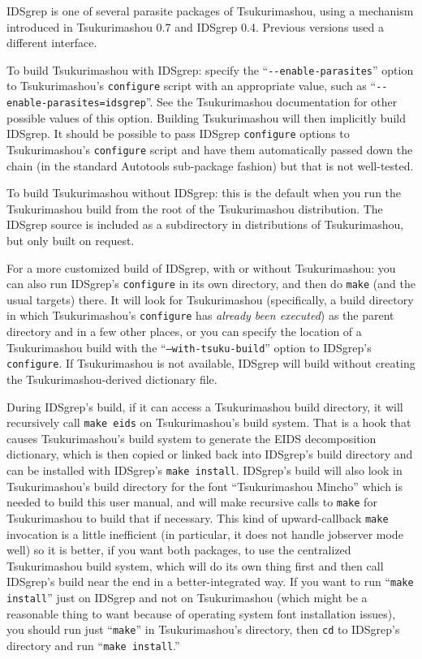\documentclass[twocolumn]{report}
\begin{document}
IDSgrep is one of several parasite packages of Tsukurimashou, using a
mechanism introduced in Tsukurimashou 0.7 and IDSgrep 0.4.  Previous
versions used a different interface.

To build Tsukurimashou with IDSgrep:  specify the
``\texttt{-{}-enable-parasites}'' option to Tsukurimashou's
\texttt{configure} script with an appropriate value, such as
``\texttt{-{}-enable-parasites=idsgrep}''.  See the Tsukurimashou
documentation for other possible values of this option.  Building
Tsukurimashou will then implicitly build IDSgrep.  It should be possible to
pass IDSgrep \texttt{configure} options to Tsukurimashou's
\texttt{configure} script and have them automatically passed down the chain
(in the standard Autotools sub-package fashion) but that is not well-tested.

To build Tsukurimashou without IDSgrep:  this is the default when you run
the Tsukurimashou build from the root of the Tsukurimashou distribution. 
The IDSgrep source is included as a subdirectory in distributions of
Tsukurimashou, but only built on request.

For a more customized build of IDSgrep, with or without Tsukurimashou:  you
can also run IDSgrep's \texttt{configure} in its own directory, and then do
\texttt{make} (and the usual targets) there.  It will look for Tsukurimashou
(specifically, a build directory in which Tsukurimashou's \texttt{configure}
has \emph{already been executed}) as the parent directory and in a few other
places, or you can specify the location of a Tsukurimashou build with the
``\texttt{--with-tsuku-build}'' option to IDSgrep's \texttt{configure}.  If
Tsukurimashou is not available, IDSgrep will build without creating
the Tsukurimashou-derived dictionary file.

During IDSgrep's build, if it can access a Tsukurimashou build directory, it
will recursively call \texttt{make eids} on Tsukurimashou's build system. 
That is a hook that causes Tsukurimashou's build system to generate the EIDS
decomposition dictionary, which is then copied or linked back into IDSgrep's
build directory and can be installed with IDSgrep's \texttt{make install}. 
IDSgrep's build will also look in Tsukurimashou's build directory for the
font ``Tsukurimashou Mincho'' which is needed to build this user manual, and
will make recursive calls to \texttt{make} for Tsukurimashou to build that
if necessary.  This kind of upward-callback \texttt{make} invocation is a
little inefficient (in particular, it does not handle jobserver mode well)
so it is better, if you want both packages, to use the centralized
Tsukurimashou build system, which will do its own thing first and then call
IDSgrep's build near the end in a better-integrated way.  If you want to
run ``\texttt{make install}'' just on IDSgrep and not on Tsukurimashou
(which might be a reasonable thing to want because of operating system font
installation issues), you should run just ``\texttt{make}'' in
Tsukurimashou's directory, then \texttt{cd} to IDSgrep's directory and run
``\texttt{make install}.''
\end{document}
